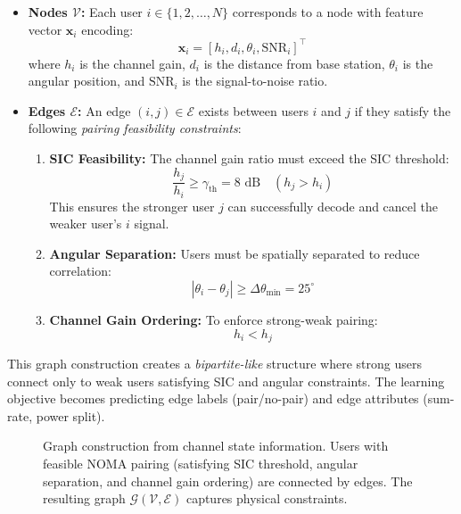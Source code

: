 \documentclass[conference]{IEEEtran}
\begin{document}
\begin{itemize}
    \item \textbf{Nodes $\mathcal{V}$:} Each user $i \in \{1, 2, \ldots, N\}$ corresponds to a node with feature vector $\mathbf{x}_i$ encoding:
    \begin{equation}
    \mathbf{x}_i = [h_i, d_i, \theta_i, \text{SNR}_i]^\top
    \end{equation}
    where $h_i$ is the channel gain, $d_i$ is the distance from base station, $\theta_i$ is the angular position, and $\text{SNR}_i$ is the signal-to-noise ratio.
    
    \item \textbf{Edges $\mathcal{E}$:} An edge $(i, j) \in \mathcal{E}$ exists between users $i$ and $j$ if they satisfy the following \emph{pairing feasibility constraints}:
    \begin{enumerate}
        \item \textbf{SIC Feasibility:} The channel gain ratio must exceed the SIC threshold:
        \begin{equation}
        \frac{h_j}{h_i} \geq \gamma_{\text{th}} = 8 \text{ dB} \quad (h_j > h_i)
        \end{equation}
        This ensures the stronger user $j$ can successfully decode and cancel the weaker user's $i$ signal.
        
        \item \textbf{Angular Separation:} Users must be spatially separated to reduce correlation:
        \begin{equation}
        |\theta_i - \theta_j| \geq \Delta\theta_{\text{min}} = 25^\circ
        \end{equation}
        
        \item \textbf{Channel Gain Ordering:} To enforce strong-weak pairing:
        \begin{equation}
        h_i < h_j
        \end{equation}
    \end{enumerate}
\end{itemize}

This graph construction creates a \emph{bipartite-like} structure where strong users connect only to weak users satisfying SIC and angular constraints. The learning objective becomes predicting edge labels (pair/no-pair) and edge attributes (sum-rate, power split).

\begin{figure}[t]
\centering
\resizebox{\columnwidth}{!}{}
\caption{Graph construction from channel state information. Users with feasible NOMA pairing (satisfying SIC threshold, angular separation, and channel gain ordering) are connected by edges. The resulting graph $\mathcal{G}(\mathcal{V}, \mathcal{E})$ captures physical constraints.}
\label{fig:graph_construction}
\end{figure}
\end{document}

